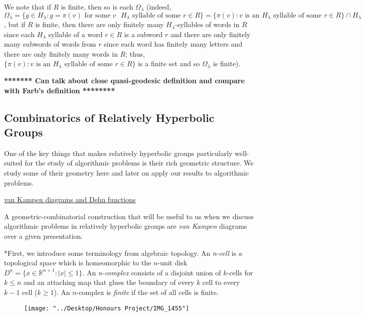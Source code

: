 \documentclass[12pt]{article}
\newcommand{\vs}{\vskip10pt}
\begin{document}
	\vs
	
	We note that if $R$ is finite, then so is each $\Omega_{\lambda}$ (indeed, $\Omega_{\lambda} = \{g \in H_{\lambda}: g = \pi(v) \text{ for some } v \text{ } H_{\lambda} \text{ syllable of some } r \in R \} = \{\pi(v): v \text{ is an } H_{\lambda} \text{ syllable of some } r \in R\} \cap H_{\lambda}$, but if $R$ is finite, then there are only finitely many $H_{\lambda}$-syllables of words in $R$ since each $H_{\lambda}$ syllable of a word $r \in R$ is a subword $r$ and there are only finitely many subwords of words from $r$ since each word has finitely many letters and there are only finitely many words in $R$; thus, $\{\pi(v): v \text{ is an } H_{\lambda} \text{ syllable of some } r \in R\}$ is a finite set and so $\Omega_{\lambda}$ is finite).
	
	\vs 

	\textbf{******* Can talk about close quasi-geodesic definition and compare with Farb's definition ********}

	\subsection{Combinatorics of Relatively Hyperbolic Groups}
	
	One of the key things that makes relatively hyperbolic groups particularly well-suited for the study of algorithmic problems is their rich geometric structure. We study some of their geometry here and later on apply our results to algorithmic problems. 
	
	\vs 
	
	\underline{van Kampen diagrams and Dehn functions}
	
	\vs 
	
	A geometric-combinatorial construction that will be useful to us when we discuss algorithmic problems in relatively hyperbolic groups are \textit{van Kampen} diagrams over a given presentation. 
	
	\vs 
	
	*First, we introduce some terminology from algebraic topology. An \textit{n-cell} is a topological space which is homeomorphic to the $n$-unit disk $D^n = \{x \in \mathbb{R}^{n+1}: \vert x \vert \leq 1\}$. An \textit{n-complex} consists of a disjoint union of $k$-cells for $k \leq n$ and an attaching map that glues the boundary of every $k$ cell to every $k-1$ cell ($k \geq 1$). An $n$-complex is \textit{finite} if the set of all cells is finite. 
\begin{figure} [h]
	\centering
	\texttt{[image: "../Desktop/Honours Project/IMG\_1455"]}
	\caption{}
	\label{fig:img1455}
\end{figure}
	
\end{document}
